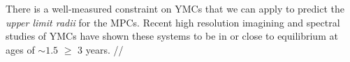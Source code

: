 There is a well-measured constraint on YMCs that we can apply to predict the\textit{ upper limit radii} for the MPCs. Recent high resolution imagining and spectral studies of YMCs have shown these systems to be in or close to equilibrium at ages of $∼1.5$ $\geq$ $3$ years. \cite{Darwin_1900}//